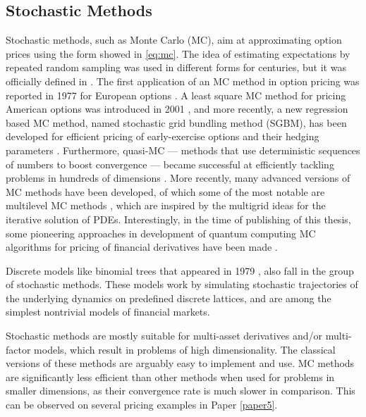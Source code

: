 \documentclass{UUThesisTemplate}
\begin{document}
\subsection{Stochastic Methods}
\par Stochastic methods, such as Monte Carlo (MC), aim at approximating option prices using the form showed in \eqref{eq:mc}. The idea of estimating expectations by repeated random sampling was used in different forms for centuries, but it was officially defined in \cite{metropolis1949monte}. The first application of an MC method in option pricing was reported in 1977 for European options \cite{boyle1977options}. A least square MC method for pricing American options was introduced in 2001 \cite{longstaff2001valuing}, and more recently, a new regression based MC method, named stochastic grid bundling method (SGBM), has been developed for efficient pricing of early-exercise options and their hedging parameters \cite{jain2015stochastic}. Furthermore, quasi-MC \cite{paskov1995faster} --- methods that use deterministic sequences of numbers to boost convergence --- became successful at efficiently tackling problems in hundreds of dimensions \cite{dick2013high}. More recently, many advanced versions of MC methods have been developed, of which some of the most notable are multilevel MC methods \cite{giles2008multilevel}, which are inspired by the multigrid ideas for the iterative solution of PDEs. %
Interestingly, in the time of publishing of this thesis, some pioneering approaches in development of quantum computing MC algorithms for pricing of financial derivatives have been made \cite{rebentrost2018quantum}.
\par Discrete models like binomial trees that appeared in 1979 \cite{cox1979option, rendleman1979two}, also fall in the group of stochastic methods. These models work by simulating stochastic trajectories of the underlying dynamics on predefined discrete lattices, and are among the simplest nontrivial models of financial markets. 
\par Stochastic methods are mostly suitable for multi-asset derivatives and/or multi-factor models, which result in problems of high dimensionality. The classical versions of these methods are arguably easy to implement and use. MC methods are significantly less efficient than other methods when used for problems in smaller dimensions, as their convergence rate is much slower in comparison. This can be observed on several pricing examples in Paper \ref{paper5}. 
%
\end{document}
